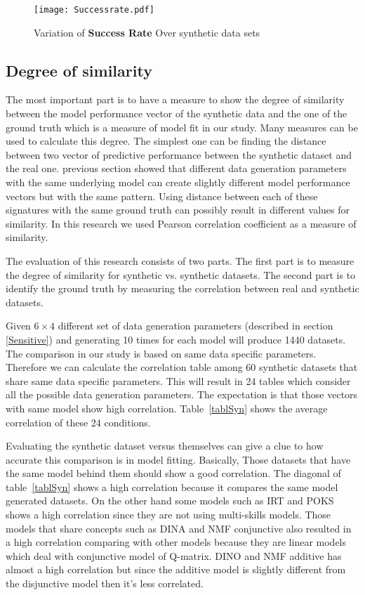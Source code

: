 \begin{figure}
  \centering
    \texttt{[image: Successrate.pdf]}
\caption{Variation of \textbf{Success Rate} Over synthetic data sets}
\label{figSucceessRate}
\end{figure}


\subsection{Degree of similarity}
The most important part is to have a measure to show the degree of similarity between the model performance vector of the synthetic data and the one of the ground truth which is a measure of model fit in our study. Many measures can be used to calculate this degree. The simplest one can be finding the distance between two vector of predictive performance between the synthetic dataset and the real one. previous section showed that different data generation parameters with the same underlying model can create slightly different model performance vectors but with the same pattern. Using distance between each of these signatures with the same ground truth can possibly result in different values for similarity. In this research we used Pearson correlation coefficient as a measure of similarity.


The evaluation of this research consists of two parts. The first part is to measure the degree of similarity for synthetic vs. synthetic datasets. The second part is to identify the ground truth by measuring the correlation between real and synthetic datasets. 

Given $6\times 4$ different set of data generation parameters (described in section \ref{Sensitive}) and generating 10 times for each model will produce 1440 datasets. The comparison in our study is based on same data specific parameters. Therefore we can calculate the correlation table among 60 synthetic datasets that share same data specific parameters. This will result in 24 tables which consider all the possible data generation parameters. The expectation is that those vectors with same model show high correlation. Table~\ref{tablSyn} shows the average correlation of these 24  conditions.

Evaluating the synthetic dataset versus themselves can give a clue to how accurate this comparison is in model fitting. Basically, Those datasets that have the same model behind them should show a good correlation. The diagonal of table~\ref{tablSyn} shows a high correlation because it compares the same model generated datasets. On the other hand some models such as IRT and POKS shows a high correlation since they are not using multi-skills models. Those models that share concepts such as DINA and NMF conjunctive also resulted in a high correlation comparing with other models because they are linear models which deal with conjunctive model of Q-matrix. DINO and NMF additive has almost a high correlation but since the additive model is slightly different from the disjunctive model then it's less correlated.


